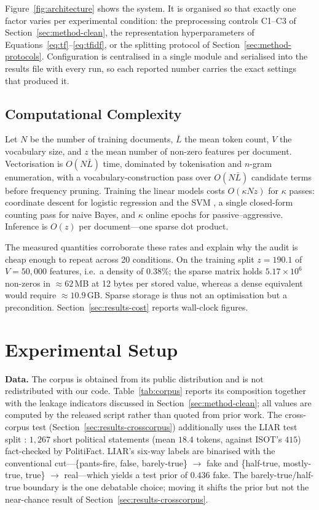 \documentclass[conference]{IEEEtran}
\begin{document}
Figure~\ref{fig:architecture} shows the system. It is organised so that exactly
one factor varies per experimental condition: the preprocessing controls C1--C3
of Section~\ref{sec:method-clean}, the representation hyperparameters of
Equations~\eqref{eq:tf}--\eqref{eq:tfidf}, or the splitting protocol of
Section~\ref{sec:method-protocols}. Configuration is centralised in a single
module and serialised into the results file with every run, so each reported
number carries the exact settings that produced it.

\subsection{Computational Complexity}
Let $N$ be the number of training documents, $\bar{L}$ the mean token count,
$V$ the vocabulary size, and $z$ the mean number of non-zero features per
document. Vectorisation is $O(N\bar{L})$ time, dominated by tokenisation and
$n$-gram enumeration, with a vocabulary-construction pass over
$O(N\bar{L})$ candidate terms before frequency pruning. Training the linear
models costs $O(\kappa N z)$ for $\kappa$ passes: coordinate descent for
logistic regression and the SVM \cite{fan2008liblinear}, a single closed-form
counting pass for naive Bayes, and $\kappa$ online epochs for
passive--aggressive. Inference is $O(z)$ per document---one sparse dot product.

The measured quantities corroborate these rates and explain why the audit is
cheap enough to repeat across 20 conditions. On the training split
$z=190.1$ of $V=50{,}000$ features, i.e.\ a density of $0.38\%$; the sparse
matrix holds $5.17\times10^{6}$ non-zeros in $\approx62$\,MB at 12 bytes per
stored value, whereas a dense equivalent would require $\approx10.9$\,GB. Sparse
storage is thus not an optimisation but a precondition. Section~\ref{sec:results-cost}
reports wall-clock figures.

\section{Experimental Setup}
\label{sec:setup}

\textbf{Data.} The corpus is obtained from its public distribution
\cite{bisaillon2020dataset} and is not redistributed with our code.
Table~\ref{tab:corpus} reports its composition together with the leakage
indicators discussed in Section~\ref{sec:method-clean}; all values are computed
by the released script rather than quoted from prior work. The cross-corpus test
(Section~\ref{sec:results-crosscorpus}) additionally uses the LIAR test split
\cite{wang2017liar}: $1{,}267$ short political statements (mean $18.4$ tokens,
against ISOT's $415$) fact-checked by PolitiFact. LIAR's six-way labels are
binarised with the conventional cut---\{pants-fire, false, barely-true\}
$\rightarrow$ fake and \{half-true, mostly-true, true\} $\rightarrow$ real---which
yields a test prior of $0.436$ fake. The barely-true/half-true boundary is the
one debatable choice; moving it shifts the prior but not the near-chance result
of Section~\ref{sec:results-crosscorpus}.
\end{document}
